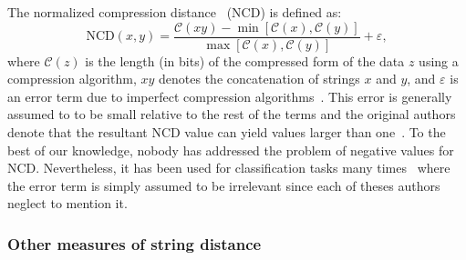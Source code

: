 \documentclass[conference]{IEEEtran}
\begin{document}
The normalized compression distance~\cite{ncd} (NCD) is defined as:
\begin{equation}
    \text{NCD}(x, y) = \frac{\mathcal{C}(xy) - \min[\mathcal{C}(x), \mathcal{C}(y)]}{\max[\mathcal{C}(x), \mathcal{C}(y)]} + \varepsilon,
\end{equation}
where $\mathcal{C}(z)$ is the length (in bits) of the compressed form of the data $z$ using a compression algorithm, $xy$ denotes the concatenation of strings $x$ and $y$, and $\varepsilon$ is an error term due to imperfect compression algorithms~\cite{ncd}. This error is generally assumed to to be small relative to the rest of the terms and the original authors denote that the resultant NCD value can yield values larger than one~\cite{ncd}. To the best of our knowledge, nobody has addressed the problem of negative values for NCD\@. %
Nevertheless, it has been used for classification tasks many times~\cite{opitz2023gzip,weinreich2023parameter,nishida2011tweet,jiang2022less} where the error term is simply assumed to be irrelevant since each of theses authors neglect to mention it.



\subsubsection{Other measures of string distance}
\label{string_metrics}
\end{document}
